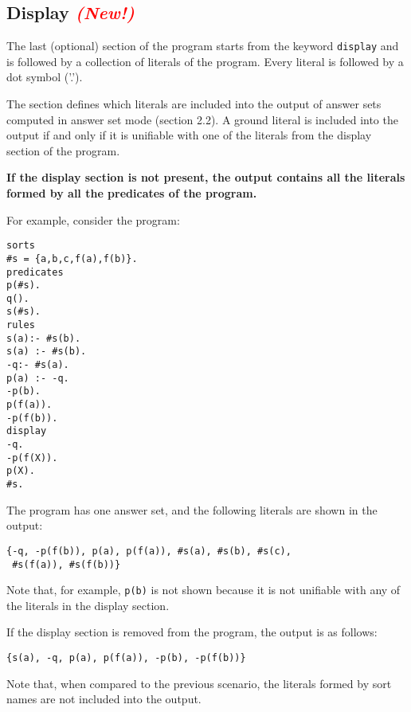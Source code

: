 \documentclass[12pt, letterpaper]{article}
\begin{document}
\subsection{Display \textit{\textcolor{red}{(New!)}}}

\medskip\noindent
The last (optional) section of the program starts from the keyword \texttt{display} and is followed by a collection of literals of the program.
Every literal is followed by a dot symbol ('.').


\medskip\noindent
The section defines which literals are included into the output of answer sets computed in answer set mode (section 2.2). A ground literal is included into the output if and only if it is unifiable with one of the literals from the display section of the program.


\medskip\noindent
\textbf{If the display section is not present, the output contains all the literals formed by all the predicates of the program.}



\medskip\noindent
For example, consider the program:


\begin{verbatim}
sorts
#s = {a,b,c,f(a),f(b)}.
predicates
p(#s).
q().
s(#s).
rules
s(a):- #s(b).
s(a) :- #s(b).
-q:- #s(a).
p(a) :- -q.
-p(b).
p(f(a)).
-p(f(b)).
display
-q.
-p(f(X)).
p(X).
#s.

\end{verbatim}


\medskip\noindent
The program has one answer set, and the following literals are shown in the output:

\begin{verbatim}
{-q, -p(f(b)), p(a), p(f(a)), #s(a), #s(b), #s(c),
 #s(f(a)), #s(f(b))}
\end{verbatim}


\medskip\noindent
Note that, for example, \texttt{p(b)} is not shown because it is not unifiable with any of the literals in the display section.


\medskip\noindent
If the display section is removed from the program, the output is as follows:

\begin{verbatim}
{s(a), -q, p(a), p(f(a)), -p(b), -p(f(b))}
\end{verbatim}


\medskip\noindent
Note that, when compared to the previous scenario, the literals formed by sort names are not included into the output.
\end{document}
